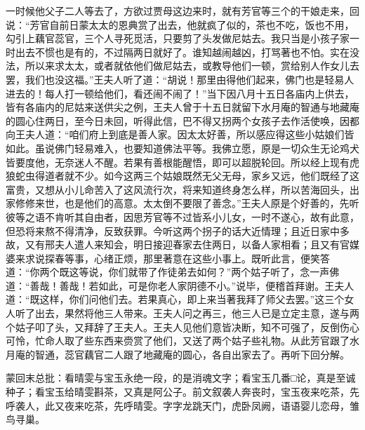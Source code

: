 \begin{parag}


    一时候他父子二人等去了，方欲过贾母这边来时，就有芳官等三个的干娘走来，回说：“芳官自前日蒙太太的恩典赏了出去，他就疯了似的，茶也不吃，饭也不用，勾引上藕官蕊官，三个人寻死觅活，只要剪了头发做尼姑去。我只当是小孩子家一时出去不惯也是有的，不过隔两日就好了。谁知越闹越凶，打骂著也不怕。实在没法，所以来求太太，或者就依他们做尼姑去，或教导他们一顿，赏给别人作女儿去罢，我们也没这福。”王夫人听了道：“胡说！那里由得他们起来，佛门也是轻易人进去的！每人打一顿给他们，看还闹不闹了！”当下因八月十五日各庙内上供去，皆有各庙内的尼姑来送供尖之例，王夫人曾于十五日就留下水月庵的智通与地藏庵的圆心住两日，至今日未回，听得此信，巴不得又拐两个女孩子去作活使唤，因都向王夫人道：“咱们府上到底是善人家。因太太好善，所以感应得这些小姑娘们皆如此。虽说佛门轻易难入，也要知道佛法平等。我佛立愿，原是一切众生无论鸡犬皆要度他，无奈迷人不醒。若果有善根能醒悟，即可以超脱轮回。所以经上现有虎狼蛇虫得道者就不少。如今这两三个姑娘既然无父无母，家乡又远，他们既经了这富贵，又想从小儿命苦入了这风流行次，将来知道终身怎么样，所以苦海回头，出家修修来世，也是他们的高意。太太倒不要限了善念。”王夫人原是个好善的，先听彼等之语不肯听其自由者，因思芳官等不过皆系小儿女，一时不遂心，故有此意，但恐将来熬不得清净，反致获罪。今听这两个拐子的话大近情理；且近日家中多故，又有邢夫人遣人来知会，明日接迎春家去住两日，以备人家相看；且又有官媒婆来求说探春等事，心绪正烦，那里著意在这些小事上。既听此言，便笑答道：“你两个既这等说，你们就带了作徒弟去如何？”两个姑子听了，念一声佛道：“善哉！善哉！若如此，可是你老人家阴德不小。”说毕，便稽首拜谢。王夫人道：“既这样，你们问他们去。若果真心，即上来当著我拜了师父去罢。”这三个女人听了出去，果然将他三人带来。王夫人问之再三，他三人已是立定主意，遂与两个姑子叩了头，又拜辞了王夫人。王夫人见他们意皆决断，知不可强了，反倒伤心可怜，忙命人取了些东西来赍赏了他们，又送了两个姑子些礼物。从此芳官跟了水月庵的智通，蕊官藕官二人跟了地藏庵的圆心，各自出家去了。再听下回分解。
\end{parag}

\begin{parag}

    \begin{note}蒙回末总批：看晴雯与宝玉永绝一段，的是消魂文字；看宝玉几番□论，真是至诚种子；看宝玉给晴雯斟茶，又真是阿公子。前文叙袭人奔丧时，宝玉夜来吃茶，先呼袭人，此又夜来吃茶，先呼晴雯。字字龙跳天门，虎卧凤阙，语语婴儿恋母，雏鸟寻巢。\end{note}
\end{parag}
